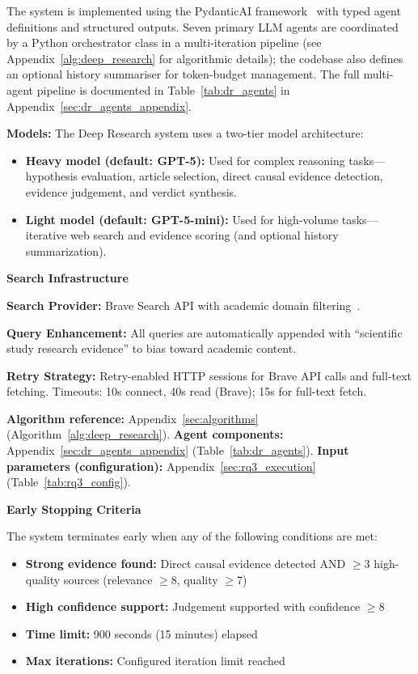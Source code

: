 The system is implemented using the PydanticAI framework~\cite{pydanticai2024} with typed agent definitions and structured outputs. Seven primary LLM agents are coordinated by a Python orchestrator class in a multi-iteration pipeline (see Appendix~\ref{alg:deep_research} for algorithmic details); the codebase also defines an optional history summariser for token-budget management. The full multi-agent pipeline is documented in Table~\ref{tab:dr_agents} in Appendix~\ref{sec:dr_agents_appendix}.

\textbf{Models:} The Deep Research system uses a two-tier model architecture:
\begin{itemize}[noitemsep]
    \item \textbf{Heavy model (default: GPT-5):} Used for complex reasoning tasks---hypothesis evaluation, article selection, direct causal evidence detection, evidence judgement, and verdict synthesis.
    \item \textbf{Light model (default: GPT-5-mini):} Used for high-volume tasks---iterative web search and evidence scoring (and optional history summarization).
\end{itemize}


\FloatBarrier

\noindent\textbf{Search Infrastructure}

\textbf{Search Provider:} Brave Search API with academic domain filtering~\cite{bravesearchapi}.


\textbf{Query Enhancement:} All queries are automatically appended with ``scientific study research evidence'' to bias toward academic content.

\textbf{Retry Strategy:} Retry-enabled HTTP sessions for Brave API calls and full-text fetching. Timeouts: 10s connect, 40s read (Brave); 15s for full-text fetch.

\textbf{Algorithm reference:} Appendix~\ref{sec:algorithms} (Algorithm~\ref{alg:deep_research}). \textbf{Agent components:} Appendix~\ref{sec:dr_agents_appendix} (Table~\ref{tab:dr_agents}). \textbf{Input parameters (configuration):} Appendix~\ref{sec:rq3_execution} (Table~\ref{tab:rq3_config}).

\noindent\textbf{Early Stopping Criteria}

The system terminates early when any of the following conditions are met:
\begin{itemize}[noitemsep]
    \item \textbf{Strong evidence found:} Direct causal evidence detected AND $\geq$3 high-quality sources (relevance $\geq 8$, quality $\geq 7$)
    \item \textbf{High confidence support:} Judgement supported with confidence $\geq 8$
    \item \textbf{Time limit:} 900 seconds (15 minutes) elapsed
    \item \textbf{Max iterations:} Configured iteration limit reached
\end{itemize}

